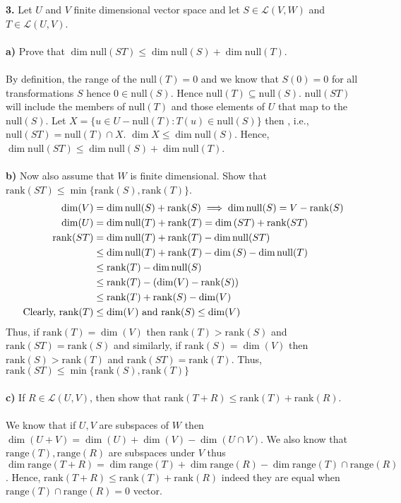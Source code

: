 \documentclass[11pt]{amsart}
\theoremstyle{definition}  %
\newcommand{\nullspace}{\mathrm{null}}
\newcommand{\rank}{\mathrm{rank}}
\begin{document}
\newpage
\vskip 0.1cm
\noindent
{\bf 3.}  Let $U$ and $V$ finite dimensional vector space and let $S \in \mathcal{L}(V,W)$ and $T \in \mathcal{L}(U,V)$. \\
\\
{\bf a)} Prove that $\dim \nullspace(ST) \leq \dim \nullspace(S) + \dim \nullspace(T)$. \\
\\
By definition, the range of the $\nullspace(T) = 0$ and we know that $S(0)=0$ for all transformations $S$ hence $0 \in \nullspace(S)$.  Hence $\nullspace(T) \subseteq \nullspace(S)$.  $\nullspace(ST)$ will include the members of $\nullspace(T)$ and those elements of $U$ that map to the $\nullspace(S)$.  Let $X=\{u\in U-\nullspace(T): T(u) \in \nullspace(S)\}$ then , i.e., $\nullspace(ST)=\nullspace(T)\cap X$. $\dim X \le \dim\nullspace(S)$.  Hence, $\dim \nullspace(ST) \leq \dim \nullspace(S) + \dim \nullspace(T)$.\\
\\
{\bf b)} Now also assume that $W$ is finite dimensional. Show that $\rank(ST) \leq \min \{\rank(S), \rank(T)\}$. \\
\begin{align*} 
	\dim(V) &= \dim \nullspace(S) + \rank(S) \implies \dim \nullspace(S) = V-\rank(S)\\
	\dim(U) &= \dim\nullspace(T) + \rank( T) = \dim\null(ST) + \rank(ST) \\
	\rank(ST) &= \dim \nullspace(T) + \rank(T)-\dim\nullspace(ST) \\
	&\le \dim\nullspace(T)+\rank(T)-\dim\null(S)-\dim\nullspace(T)\\
	&\le \rank(T)-\dim\nullspace(S)\\
	&\le \rank(T)-(\dim(V)-\rank(S))\\
	&\le \rank(T)+\rank(S)-\dim(V) \\
	\text{Clearly, } \rank(T) &\le \dim(V) \text{ and } \rank(S) \le \dim(V) 
\end{align*}Thus, if $\rank(T) = \dim(V)$ then $\rank(T) > \rank(S)$ and $\rank(ST) = \rank(S)$ and similarly, if $\rank(S) = \dim(V)$ then $\rank(S) > \rank(T)$ and $\rank(ST) = \rank(T)$.  Thus, $\rank(ST) \le \min\{\rank(S), \rank(T)\}$\\
\\
{\bf c)} If $R \in \mathcal{L}(U,V)$, then show that $\rank(T+R) \leq \rank(T) + \rank(R)$.\\
\\
\newcommand{\range}{\mathrm{range}}
We know that if $U,V$ are subspaces of $W$ then $\dim(U+V) = \dim(U) + \dim(V) - \dim(U\cap V)$.  We also know that $\range(T), \range(R)$ are subspaces under $V$ thus $\dim \range(T+R) = \dim\range(T) + \dim\range(R) - \dim\range(T) \cap \range(R)$.  Hence, $\rank(T+R) \le \rank(T)+\rank(R)$ indeed they are equal when $\range(T) \cap \range(R) = 0$ vector.
\\
\end{document}
